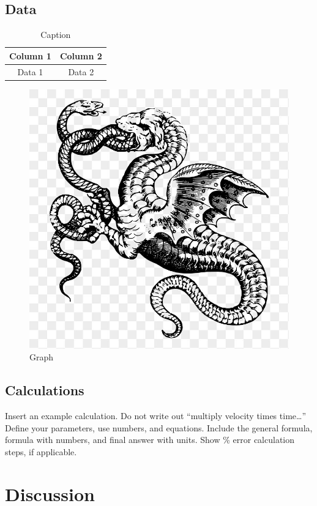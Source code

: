 \documentclass[stu,biblatex,floatsintext,draftall]{apa7}
\begin{document}
\subsection{Data}
\begin{table}
	\centering
	\caption{Caption}
	\label{tab:data}
	\begin{tabular}{cc}
		Column 1 & Column 2 \\
		\hline
		Data 1 & Data 2
	\end{tabular}
\end{table}
\begin{figure}
	\caption{Graph}
	\label{fig:data-graph}
	\includegraphics{dragon}
\end{figure}

\subsection{Calculations}
Insert an example calculation.  Do not write out “multiply velocity times time…”  Define your parameters, use numbers, and equations. Include the general formula, formula with numbers, and final answer with units. Show \% error calculation steps, if applicable.

\section{Discussion}
\end{document}
